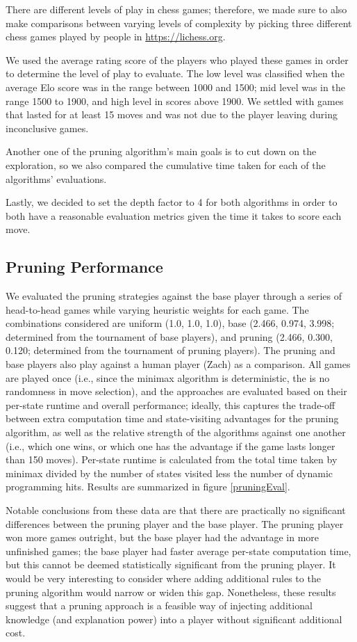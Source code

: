 \documentclass[letterpaper]{article}
\begin{document}
There are different levels of play in chess games; therefore, we made sure to also make comparisons between varying levels of complexity by picking three different chess games played by people in \url{https://lichess.org}. 

We used the average rating score of the players who played these games in order to determine the level of play to evaluate. The low level was classified when the average Elo score was in the range between 1000 and 1500; mid level was in the range 1500 to 1900, and high level in scores above 1900. We settled with games that lasted for at least 15 moves and was not due to the player leaving during inconclusive games.

Another one of the pruning algorithm’s main goals is to cut down on the exploration, so we also compared the cumulative time taken for each of the algorithms' evaluations.

Lastly, we decided to set the depth factor to 4 for both algorithms in order to both have a reasonable evaluation metrics given the time it takes to score each move.

\subsection{Pruning Performance}
We evaluated the pruning strategies against the base player through a series of head-to-head games while varying heuristic weights for each game.  The combinations considered are uniform (1.0, 1.0, 1.0), base (2.466, 0.974, 3.998; determined from the tournament of base players), and pruning (2.466, 0.300, 0.120; determined from the tournament of pruning players).  The pruning and base players also play against a human player (Zach) as a comparison.  All games are played once (i.e., since the minimax algorithm is deterministic, the is no randomness in move selection), and the approaches are evaluated based on their per-state runtime and overall performance; ideally, this captures the trade-off between extra computation time and state-visiting advantages for the pruning algorithm, as well as the relative strength of the algorithms against one another (i.e., which one wins, or which one has the advantage if the game lasts longer than 150 moves).  Per-state runtime is calculated from the total time taken by minimax divided by the number of states visited less the number of dynamic programming hits.  Results are summarized in figure \ref{pruningEval}.

Notable conclusions from these data are that there are practically no significant differences between the pruning player and the base player.  The pruning player won more games outright, but the base player had the advantage in more unfinished games; the base player had faster average per-state computation time, but this cannot be deemed statistically significant from the pruning player.  It would be very interesting to consider where adding additional rules to the pruning algorithm would narrow or widen this gap.  Nonetheless, these results suggest that a pruning approach is a feasible way of injecting additional knowledge (and explanation power) into a player without significant additional cost.
\end{document}
